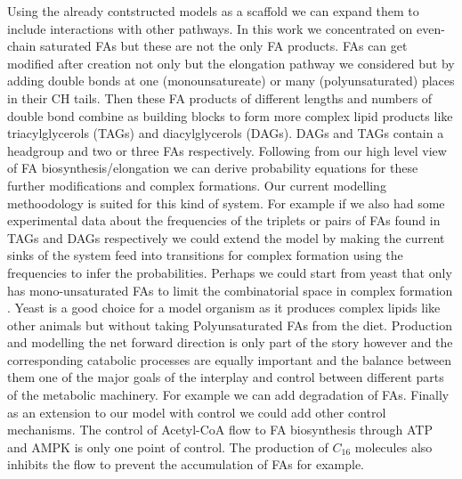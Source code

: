 Using the already contstructed models as a scaffold we can expand
them to include interactions with other pathways. In this work we
concentrated on even-chain saturated FAs but these are not the only FA
products. FAs can get modified after creation not only but the
elongation pathway we considered but by adding double bonds at one
(monounsatureate) or many (polyunsaturated) places in their CH
tails. Then these FA products of different lengths and numbers of
double bond combine as building blocks to form more complex lipid
products like triacylglycerols (TAGs) and diacylglycerols (DAGs). DAGs
and TAGs contain a headgroup and two or three FAs
respectively. Following from our high level view of FA
biosynthesis/elongation we can derive probability equations for these further
modifications and complex formations. Our current
modelling methoodology is suited for this kind of system. For example
if we also had some experimental data about the frequencies of the
triplets or pairs of FAs found in TAGs and DAGs respectively we could
extend the model by making the current sinks of the system feed into
transitions for complex formation using the frequencies to infer the
probabilities. Perhaps we could start from yeast that only has
mono-unsaturated FAs to limit the combinatorial space in complex
formation \cite [] {nielsen2009systems}. Yeast is a good choice for a
model organism as it produces complex lipids like other animals but
without taking Polyunsaturated FAs from the diet.
Production and modelling the net forward direction is only part of
the story however and the corresponding catabolic processes are
equally important and the balance between them one of the major goals
of the interplay and control between different parts of the metabolic
machinery. For example we can add degradation of
FAs. Finally as an extension to our model with control we could add
other control mechanisms. The control of Acetyl-CoA flow to FA
biosynthesis through ATP and AMPK is only one point of control. The
production of $C_{16}$ molecules also inhibits the flow to prevent the
accumulation of FAs for example.


